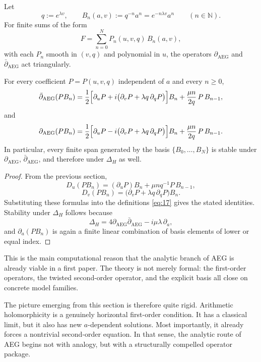 Let
\[
q:=e^{\lambda v},
\qquad
B_n(a,v):=q^{-n}a^n=e^{-n\lambda v}a^n
\qquad (n\in\mathbb{N}).
\]
For finite sums of the form
\[
F=\sum_{n=0}^N P_n(u,v,q)\,B_n(a,v),
\]
with each $P_n$ smooth in $(v,q)$ and polynomial in $u$, the operators $\partial_{\mathrm{AEG}}$ and $\bar\partial_{\mathrm{AEG}}$ act triangularly.

\begin{proposition}\label{prop:affine_appell_holomorphic_operators}
For every coefficient $P=P(u,v,q)$ independent of $a$ and every $n\ge 0$,
\[
\bar\partial_{\mathrm{AEG}}(PB_n)
=
\frac12\Bigl[\partial_uP+i\bigl(\partial_vP+\lambda q\,\partial_qP\bigr)\Bigr]B_n
+
\frac{\mu n}{2q}\,P\,B_{n-1},
\]
and
\[
\partial_{\mathrm{AEG}}(PB_n)
=
\frac12\Bigl[\partial_uP-i\bigl(\partial_vP+\lambda q\,\partial_qP\bigr)\Bigr]B_n
+
\frac{\mu n}{2q}\,P\,B_{n-1}.
\]
In particular, every finite span generated by the basis $\{B_0,\dots,B_N\}$ is stable under $\partial_{\mathrm{AEG}}$, $\bar\partial_{\mathrm{AEG}}$, and therefore under $\Delta_H$ as well.
\end{proposition}

\begin{proof}
From the previous section,
\[
D_u(PB_n)=(\partial_uP)B_n+\mu n q^{-1}P\,B_{n-1},
\]
\[
D_v(PB_n)=\bigl(\partial_vP+\lambda q\,\partial_qP\bigr)B_n.
\]
Substituting these formulas into the definitions \eqref{eq:17} gives the stated identities. Stability under $\Delta_H$ follows because
\[
\Delta_H
=
4\partial_{\mathrm{AEG}}\bar\partial_{\mathrm{AEG}}-i\mu\lambda\,\partial_a,
\]
and $\partial_a(PB_n)$ is again a finite linear combination of basis elements of lower or equal index.
\end{proof}

This is the main computational reason that the analytic branch of AEG is already viable in a first paper. The theory is not merely formal: the first-order operators, the twisted second-order operator, and the explicit basis all close on concrete model families.

\medskip

The picture emerging from this section is therefore quite rigid. Arithmetic holomorphicity is a genuinely horizontal first-order condition. It has a classical limit, but it also has new $a$-dependent solutions. Most importantly, it already forces a nontrivial second-order equation. In that sense, the analytic route of AEG begins not with analogy, but with a structurally compelled operator package.
